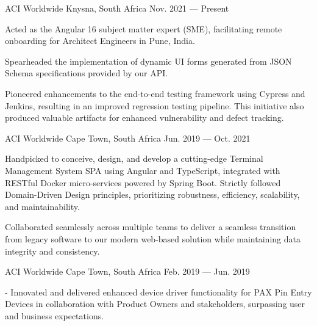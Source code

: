 
\begin{cventries}
  {ACI Worldwide}
  {Knysna, South Africa}
  {Nov. 2021 --- Present}
  {
    \begin{cvitems}
      \item {Acted as the Angular 16 subject matter expert (SME), facilitating
                  remote onboarding for Architect Engineers in Pune, India.}
      \item {Spearheaded the
                  implementation of dynamic UI forms generated from JSON Schema specifications
                  provided by our API.}
      \item {Pioneered enhancements to the end-to-end testing framework
                  using Cypress and Jenkins, resulting in an improved regression testing
                  pipeline. This initiative also produced valuable artifacts for enhanced
                  vulnerability and defect tracking.}
    \end{cvitems}
  }

  {ACI Worldwide}
  {Cape Town, South Africa}
  {Jun. 2019 --- Oct. 2021}
  {
    \begin{cvitems}
      \item {Handpicked to conceive, design, and develop a cutting-edge
                  Terminal Management System SPA using Angular and TypeScript, integrated
                  with RESTful Docker micro-services powered by Spring Boot.}
            {Strictly followed Domain-Driven Design principles, prioritizing
                  robustness, efficiency, scalability, and maintainability.}
      \item {Collaborated seamlessly across multiple teams to deliver a
                  seamless transition from legacy software to our modern web-based solution
                  while maintaining data integrity and consistency.}
    \end{cvitems}
  }

  {ACI Worldwide}
  {Cape Town, South Africa}
  {Feb. 2019 --- Jun. 2019}
  {
    \begin{cvitems}
      \item {- Innovated and delivered enhanced device driver
                  functionality for PAX Pin Entry Devices in collaboration with Product
                  Owners and stakeholders, surpassing user and business expectations.}
    \end{cvitems}
  }

\end{cventries}
